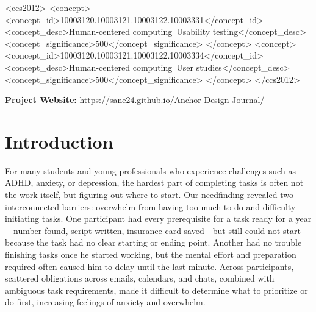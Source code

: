 \documentclass[sigplan,screen]{acmart}
\begin{document}
\begin{CCSXML}
<ccs2012>
 <concept>
  <concept_id>10003120.10003121.10003122.10003331</concept_id>
  <concept_desc>Human-centered computing~Usability testing</concept_desc>
  <concept_significance>500</concept_significance>
 </concept>
 <concept>
  <concept_id>10003120.10003121.10003122.10003334</concept_id>
  <concept_desc>Human-centered computing~User studies</concept_desc>
  <concept_significance>500</concept_significance>
 </concept>
</ccs2012>
\end{CCSXML}




\maketitle

\noindent\textbf{Project Website:} \url{https://sane24.github.io/Anchor-Design-Journal/}

\section{Introduction}
For many students and young professionals who experience challenges such as ADHD, anxiety, or depression, the hardest part of completing tasks is often not the work itself, but figuring out where to start. Our needfinding revealed two interconnected barriers: overwhelm from having too much to do and difficulty initiating tasks. One participant had every prerequisite for a task ready for a year—number found, script written, insurance card saved—but still could not start because the task had no clear starting or ending point. Another had no trouble finishing tasks once he started working, but the mental effort and preparation required often caused him to delay until the last minute. Across participants, scattered obligations across emails, calendars, and chats, combined with ambiguous task requirements, made it difficult to determine what to prioritize or do first, increasing feelings of anxiety and overwhelm.
\end{document}
